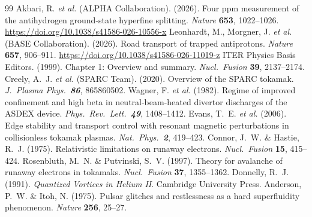 \documentclass[12pt,a4paper]{article}
\begin{document}
\begin{thebibliography}{99}
     Akbari, R. \textit{et al.} (ALPHA Collaboration). (2026). Four ppm measurement of the antihydrogen ground-state hyperfine splitting. \textit{Nature} \textbf{653}, 1022--1026. \url{https://doi.org/10.1038/s41586-026-10556-x}
     Leonhardt, M., Morgner, J. \textit{et al.} (BASE Collaboration). (2026). Road transport of trapped antiprotons. \textit{Nature} \textbf{657}, 906--911. \url{https://doi.org/10.1038/s41586-026-11019-z}
     ITER Physics Basis Editors. (1999). Chapter 1: Overview and summary. \textit{Nucl.\ Fusion} \textbf{39}, 2137--2174.
     Creely, A.~J. \textit{et al.} (SPARC Team). (2020). Overview of the SPARC tokamak. \textit{J.\ Plasma Phys.\ \textbf{86}}, 865860502.
     Wagner, F. \textit{et al.} (1982). Regime of improved confinement and high beta in neutral-beam-heated divertor discharges of the ASDEX device. \textit{Phys.\ Rev.\ Lett.\ \textbf{49}}, 1408--1412.
     Evans, T.~E. \textit{et al.} (2006). Edge stability and transport control with resonant magnetic perturbations in collisionless tokamak plasmas. \textit{Nat.\ Phys.\ \textbf{2}}, 419--423.
     Connor, J.~W. \& Hastie, R.~J. (1975). Relativistic limitations on runaway electrons. \textit{Nucl.\ Fusion} \textbf{15}, 415--424.
     Rosenbluth, M.~N. \& Putvinski, S.~V. (1997). Theory for avalanche of runaway electrons in tokamaks. \textit{Nucl.\ Fusion} \textbf{37}, 1355--1362.
     Donnelly, R.~J. (1991). \textit{Quantized Vortices in Helium II}. Cambridge University Press.
     Anderson, P.~W. \& Itoh, N. (1975). Pulsar glitches and restlessness as a hard superfluidity phenomenon. \textit{Nature} \textbf{256}, 25--27.
\end{thebibliography}
\end{document}
